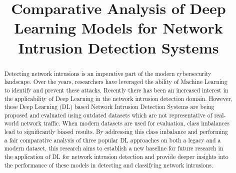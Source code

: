\documentclass[conference]{IEEEtran}
\begin{document}
\title{Comparative Analysis of Deep Learning Models for Network Intrusion Detection Systems}

\author{
\and
{}
}

\maketitle



\raggedbottom

\begin{abstract}
\noindet Detecting network intrusions is an imperative part of the modern cybersecurity landscape. Over the years, researchers have leveraged the ability of Machine Learning to identify and prevent these attacks. Recently there has been an increased interest in the applicability of Deep Learning in the network intrusion detection domain. However, these Deep Learning (DL) based Network Intrusion Detection Systems are being proposed and evaluated using outdated datasets which are not representative of real-world network traffic. When modern datasets are used for evaluation, class imbalances lead to significantly biased results. By addressing this class imbalance and performing a fair comparative analysis of three popular DL approaches on both a legacy and a modern dataset, this research aims to establish a new baseline for future research in the application of DL for network intrusion detection and provide deeper insights into the performance of these models in detecting and classifying network intrusions. %
\end{abstract}
\end{document}
